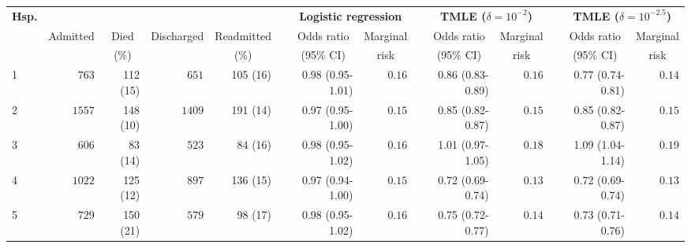 \documentclass[]{article}\usepackage[]{graphicx}\usepackage[]{color}
\begin{document}
\begin{landscape}

\setmainfont[Scale=1]{Cambria}
\linespread{1}

\begin{table}[!tbp]
\begin{center}
\begin{tabular}{lrrrrcrrcrrcrr}
\hline\hline
\multicolumn{1}{l}{\bfseries Hsp.}&\multicolumn{4}{c}{\bfseries }&\multicolumn{1}{c}{\bfseries }&\multicolumn{2}{c}{\bfseries Logistic regression}&\multicolumn{1}{c}{\bfseries }&\multicolumn{2}{c}{\bfseries TMLE ($\delta=10^{-2}$)}&\multicolumn{1}{c}{\bfseries }&\multicolumn{2}{c}{\bfseries TMLE ($\delta=10^{-2.5}$)}\tabularnewline
\cline{7-8} \cline{10-11} \cline{13-14}
\multicolumn{1}{l}{}&\multicolumn{1}{c}{Admitted}&\multicolumn{1}{c}{Died}&\multicolumn{1}{c}{Discharged}&\multicolumn{1}{c}{Readmitted}&\multicolumn{1}{c}{}&\multicolumn{1}{c}{Odds ratio}&\multicolumn{1}{c}{Marginal}&\multicolumn{1}{c}{}&\multicolumn{1}{c}{Odds ratio}&\multicolumn{1}{c}{Marginal}&\multicolumn{1}{c}{}&\multicolumn{1}{c}{Odds ratio}&\multicolumn{1}{c}{Marginal}\tabularnewline
&&\multicolumn{1}{c}{{\scriptsize (\%)}}&&\multicolumn{1}{c}{{\scriptsize (\%)}}&&\multicolumn{1}{c}{{\scriptsize (95\% CI)}}&\multicolumn{1}{c}{{\scriptsize risk}}&&\multicolumn{1}{c}{{\scriptsize (95\% CI)}}&\multicolumn{1}{c}{{\scriptsize risk}}&&\multicolumn{1}{c}{{\scriptsize (95\% CI)}}&\multicolumn{1}{c}{{\scriptsize risk}}\tabularnewline
\hline
1&$ 763$&112 (15)&$ 651$&105 (16)&&0.98 (0.95-1.01)&$0.16$&&0.86 (0.83-0.89)&$0.16$&&0.77 (0.74-0.81)&$0.14$\tabularnewline
2&$1557$&148 (10)&$1409$&191 (14)&&0.97 (0.95-1.00)&$0.15$&&0.85 (0.82-0.87)&$0.15$&&0.85 (0.82-0.87)&$0.15$\tabularnewline
3&$ 606$&83 (14)&$ 523$&84 (16)&&0.98 (0.95-1.02)&$0.16$&&1.01 (0.97-1.05)&$0.18$&&1.09 (1.04-1.14)&$0.19$\tabularnewline
4&$1022$&125 (12)&$ 897$&136 (15)&&0.97 (0.94-1.00)&$0.15$&&0.72 (0.69-0.74)&$0.13$&&0.72 (0.69-0.74)&$0.13$\tabularnewline
5&$ 729$&150 (21)&$ 579$&98 (17)&&0.98 (0.95-1.02)&$0.16$&&0.75 (0.72-0.77)&$0.14$&&0.73 (0.71-0.76)&$0.14$\tabularnewline

\end{tabular}
\end{center}
\end{table}
\end{landscape}
\end{document}
